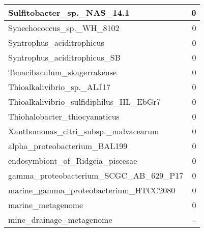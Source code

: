 \documentclass[12pt,a4paper]{article}
\begin{document}
\begin{table}[ht]
\begin{center}
\begin{tabular}{|l*{1}{|r}|}
Sulfitobacter\_sp.\_NAS\_14.1 & 0 \\ \hline
Synechococcus\_sp.\_WH\_8102 & 0 \\ \hline
Syntrophus\_aciditrophicus & 0 \\ \hline
Syntrophus\_aciditrophicus\_SB & 0 \\ \hline
Tenacibaculum\_skagerrakense & 0 \\ \hline
Thioalkalivibrio\_sp.\_ALJ17 & 0 \\ \hline
Thioalkalivibrio\_sulfidiphilus\_HL\_EbGr7 & 0 \\ \hline
Thiohalobacter\_thiocyanaticus & 0 \\ \hline
Xanthomonas\_citri\_subsp.\_malvacearum & 0 \\ \hline
alpha\_proteobacterium\_BAL199 & 0 \\ \hline
endosymbiont\_of\_Ridgeia\_piscesae & 0 \\ \hline
gamma\_proteobacterium\_SCGC\_AB\_629\_P17 & 0 \\ \hline
marine\_gamma\_proteobacterium\_HTCC2080 & 0 \\ \hline
marine\_metagenome & 0 \\ \hline
mine\_drainage\_metagenome & - \\ \hline
\end{tabular}
\end{center}
\end{table}
\end{document}
